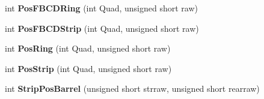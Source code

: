 \begin{DoxyCompactItemize}
int {\bfseries Pos\+F\+B\+C\+D\+Ring} (int Quad, unsigned short raw)
\item 
\mbox{\label{class_calibration_a9ee9ef612f7485f5371916bf524bb036}} 
int {\bfseries Pos\+F\+B\+C\+D\+Strip} (int Quad, unsigned short raw)
\item 
\mbox{\label{class_calibration_a240b3ac33e55af3f762d2cecc5d06b2b}} 
int {\bfseries Pos\+Ring} (int Quad, unsigned short raw)
\item 
\mbox{\label{class_calibration_a1d12aea9e2be55852b937e8be3ffbae1}} 
int {\bfseries Pos\+Strip} (int Quad, unsigned short raw)
\item 
\mbox{\label{class_calibration_af2ce93c038cdfd3e9fb1e4ffa093097c}} 
int {\bfseries Strip\+Pos\+Barrel} (unsigned short strraw, unsigned short rearraw)
\end{DoxyCompactItemize}
